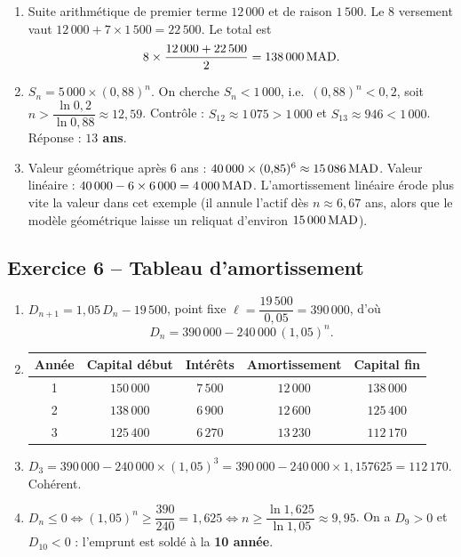 \documentclass[11pt,a4paper]{article}
\begin{document}
\begin{enumerate}
  \item Suite arithmétique de premier terme $12\,000$ et de raison $1\,500$. Le $8$ versement vaut $12\,000+7\times 1\,500=22\,500$. Le total est
  \[
  8\times\dfrac{12\,000+22\,500}{2} = 138\,000\,\mathrm{MAD}.
  \]

  \item $S_n = 5\,000\times (0{,}88)^n$. On cherche $S_n<1\,000$, i.e.\ $(0{,}88)^n < 0{,}2$, soit $n > \dfrac{\ln 0{,}2}{\ln 0{,}88}\approx 12{,}59$. Contrôle : $S_{12}\approx 1\,075>1\,000$ et $S_{13}\approx 946<1\,000$. Réponse : \textbf{$13$ ans}.

  \item Valeur géométrique après $6$ ans : $40\,000\times (0{,}85)^6 \approx 15\,086\,\mathrm{MAD}$. Valeur linéaire : $40\,000-6\times 6\,000=4\,000\,\mathrm{MAD}$. L'amortissement linéaire érode plus vite la valeur dans cet exemple (il annule l'actif dès $n\approx 6{,}67$ ans, alors que le modèle géométrique laisse un reliquat d'environ $15\,000\,\mathrm{MAD}$).
\end{enumerate}

\subsection{Exercice 6 -- Tableau d'amortissement}

\begin{enumerate}
  \item $D_{n+1}=1{,}05\, D_n - 19\,500$, point fixe $\ell=\dfrac{19\,500}{0{,}05}=390\,000$, d'où
  \[
  D_n = 390\,000 - 240\,000\,(1{,}05)^n.
  \]

  \item
  \begin{center}
  \renewcommand{\arraystretch}{1.2}
  \begin{tabular}{c|cccc}
  \toprule
  Année & Capital début & Intérêts & Amortissement & Capital fin \\
  \midrule
  1 & $150\,000$ & $7\,500$ & $12\,000$ & $138\,000$ \\
  2 & $138\,000$ & $6\,900$ & $12\,600$ & $125\,400$ \\
  3 & $125\,400$ & $6\,270$ & $13\,230$ & $112\,170$ \\
  \bottomrule
  \end{tabular}
  \end{center}

  \item $D_3 = 390\,000 - 240\,000\times (1{,}05)^3 = 390\,000 - 240\,000\times 1{,}157625 = 112\,170$. Cohérent.

  \item $D_n\leq 0 \iff (1{,}05)^n \geq \dfrac{390}{240}=1{,}625 \iff n\geq \dfrac{\ln 1{,}625}{\ln 1{,}05}\approx 9{,}95$. On a $D_9>0$ et $D_{10}<0$ : l'emprunt est soldé à la \textbf{10 année}.
\end{enumerate}
\end{document}
